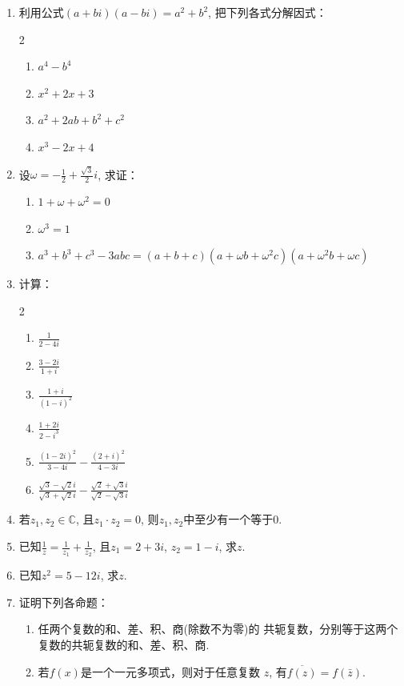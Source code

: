 \begin{enumerate}
\item 利用公式$(a+bi)(a-bi)=a^2+b^2$, 把下列各式分解因式：
\begin{multicols}{2}
 \begin{enumerate}[(1)]
    \item $a^{4}-b^{4}$
    \item $x^{2}+2x+3$
    \item $a^{2}+2ab+b^{2}+c^{2}$
    \item $x^{3}-2x+4$
\end{enumerate}   
\end{multicols}


\item 设$\omega = - \frac 12+ \frac {\sqrt {3}}2i$, 求证：
\begin{enumerate}[(1)]
    \item $1+\omega+\omega^{2}=0$
    \item $\omega^{3}=1$
    \item $a^{3}+b^{3}+c^{3}-3abc=(a+b+c)(a+\omega b+\omega^{2}c)(a+\omega^{2}b+\omega c)$
\end{enumerate}
\item 计算：
\begin{multicols}{2}
\begin{enumerate}[(1)]
    \item $\frac{1}{2-4i}$
    \item $\frac{3-2i}{1+i}$
    \item $\frac{1+i}{(1-i)^{2}}$
    \item $\frac{1+2i}{2-i^3}$
    \item $\frac{(1-2i)^2}{3-4i}-\frac{(2+i)^2}{4-3i}$
    \item $\frac{\sqrt{3}-\sqrt{2}i}{\sqrt{3}+\sqrt{2}i}-\frac{\sqrt{2}+\sqrt{3}i}{\sqrt{2}-\sqrt{3}i}$
\end{enumerate}
\end{multicols}

\item 若$z_1,z_2\in\mathbb{C}$, 且$z_1\cdot z_2=0$, 则$z_1,z_2$中至少有一个等于0.

\item 已知$\frac1z=\frac{1}{z_{1}}+\frac{1}{z_{2}}$, 且$z_1=2+3i$, $z_{2}=1-i$,
求$z$.

\item 已知$z^2=5-12i$, 求$z$.

\item 证明下列各命题：
\begin{enumerate}[(1)]
    \item 任两个复数的和、差、积、商(除数不为零)的
共轭复数，分别等于这两个复数的共轭复数的和、差、积、商.
\item 若$f(x)$是一个一元多项式，则对于任意复数
$z$, 有$\overline{f(z)}=f(\bar{z})$.
\end{enumerate}


\end{enumerate}
